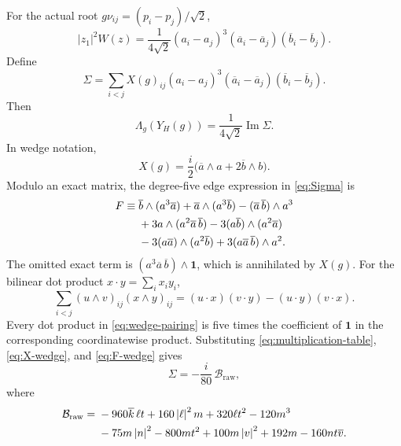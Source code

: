 \documentclass[11pt,reqno]{amsart}
\theoremstyle{definition}
\theoremstyle{remark}
\newcommand{\one}{\mathbf 1}
\newcommand{\abs}[1]{\left\lvert #1\right\rvert}
\begin{document}
For the actual root $g\nu_{ij}=(p_i-p_j)/\sqrt2$,
\begin{equation}\label{eq:quintic-edge}
\abs{z_1}^2W(z)
=\frac1{4\sqrt2}
(a_i-a_j)^3(\overline a_i-\overline a_j)
(\overline b_i-\overline b_j).
\end{equation}
Define
\begin{equation}\label{eq:Sigma}
\Sigma=\sum_{i<j}X(g)_{ij}
(a_i-a_j)^3(\overline a_i-\overline a_j)
(\overline b_i-\overline b_j).
\end{equation}
Then
\begin{equation}\label{eq:Lambda-H-Sigma}
\Lambda_g(Y_H(g))=\frac1{4\sqrt2}\operatorname{Im}\Sigma.
\end{equation}
In wedge notation,
\begin{equation}\label{eq:X-wedge}
X(g)=\frac i2\bigl(\overline a\wedge a+2\overline b\wedge b\bigr).
\end{equation}
Modulo an exact matrix, the degree-five edge expression in
\eqref{eq:Sigma} is
\begin{align}
F\equiv{}&
\overline b\wedge(a^3\overline a)
+\overline a\wedge(a^3\overline b)
-(\overline a\,\overline b)\wedge a^3\notag\\
&+3a\wedge(a^2\overline a\,\overline b)
-3(a\overline b)\wedge(a^2\overline a)\notag\\
&-3(a\overline a)\wedge(a^2\overline b)
+3(a\overline a\,\overline b)\wedge a^2.
\label{eq:F-wedge}
\end{align}
The omitted exact term is
$(a^3\overline a\,\overline b)\wedge\one$, which is annihilated by $X(g)$.
For the bilinear dot product $x\cdot y=\sum_i x_iy_i$,
\begin{equation}\label{eq:wedge-pairing}
\sum_{i<j}(u\wedge v)_{ij}(x\wedge y)_{ij}
=(u\cdot x)(v\cdot y)-(u\cdot y)(v\cdot x).
\end{equation}
Every dot product in \eqref{eq:wedge-pairing} is five times the coefficient of
$\one$ in the corresponding coordinatewise product.  Substituting
\eqref{eq:multiplication-table}, \eqref{eq:X-wedge}, and
\eqref{eq:F-wedge} gives
\begin{equation}\label{eq:Sigma-Braw}
\Sigma=-\frac i{80}\,\mathcal B_{\mathrm{raw}},
\end{equation}
where
\begin{align}
\mathcal B_{\mathrm{raw}}={}&
-960\overline k\,\ell t
+160\abs\ell^2m
+320\ell t^2
-120m^3\notag\\
&-75m\abs n^2
-800mt^2
+100m\abs v^2
+192m
-160nt\overline v.
\label{eq:Braw}
\end{align}
\end{document}
